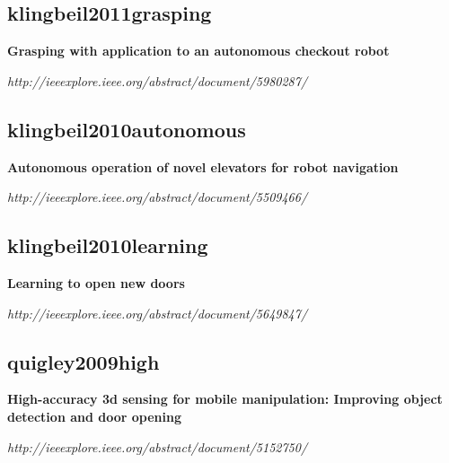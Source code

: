 \subsection{klingbeil2011grasping}
\textbf{Grasping with application to an autonomous checkout robot}

\textit{http://ieeexplore.ieee.org/abstract/document/5980287/}


\subsection{klingbeil2010autonomous}
\textbf{Autonomous operation of novel elevators for robot navigation}

\textit{http://ieeexplore.ieee.org/abstract/document/5509466/}

\subsection{klingbeil2010learning}
\textbf{Learning to open new doors}

\textit{http://ieeexplore.ieee.org/abstract/document/5649847/}

\subsection{quigley2009high}
\textbf{High-accuracy 3d sensing for mobile manipulation: Improving object detection and door opening}

\textit{http://ieeexplore.ieee.org/abstract/document/5152750/}
